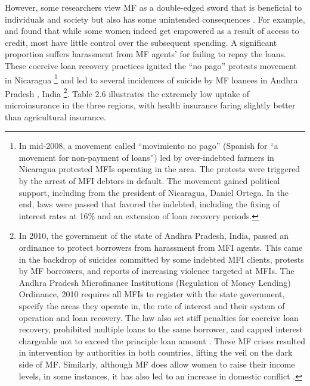 \documentclass[a4paper,nobind]{templates/ociamthesis}
\begin{document}
However, some researchers view MF as a double-edged sword that is beneficial to individuals and society but also has some unintended consequences \autocite{ganle2015microcredit,van2012impact}. For example, \textcite{ganle2015microcredit} and \textcite{van2012impact} found that while some women indeed get empowered as a result of access to credit, most have little control over the subsequent spending. A significant proportion suffers harassment from MF agents' for failing to repay the loans. These coercive loan recovery practices ignited the ``no pago'' protests movement in Nicaragua \footnote{In mid-2008, a movement called ``movimiento no pago'' (Spanish for ``a movement for non-payment of loans'') led by over-indebted farmers in Nicaragua protested MFIs operating in the area. The protests were triggered by the arrest of MFI debtors in default. The movement gained political support, including from the president of Nicaragua, Daniel Ortega. In the end, laws were passed that favored the indebted, including the fixing of interest rates at 16\% and an extension of loan recovery periods.} and led to several incidences of suicide by MF loanees in Andhra Pradesh , India \footnote{In 2010, the government of the state of Andhra Pradesh, India, passed an ordinance to protect borrowers from harassment from MFI agents. This came in the backdrop of suicides committed by some indebted MFI clients, protests by MF borrowers, and reports of increasing violence targeted at MFIs. The Andhra Pradesh Microfinance Institutions (Regulation of Money Lending) Ordinance, 2010 requires all MFIs to register with the state government, specify the areas they operate in, the rate of interest and their system of operation and loan recovery. The law also set stiff penalties for coercive loan recovery, prohibited multiple loans to the same borrower, and capped interest chargeable not to exceed the principle loan amount \autocite{ghosh2013microfinance,bastiaensen2013after,wright2016rebuilding}. These MF crises resulted in intervention by authorities in both countries, lifting the veil on the dark side of MF. Similarly, although MF does allow women to raise their income levels, in some instances, it has also led to an increase in domestic conflict \autocite{salia2018women}.}. Table 2.6 illustrates the extremely low uptake of microinsurance in the three regions, with health insurance faring slightly better than agricultural insurance.
\end{document}
